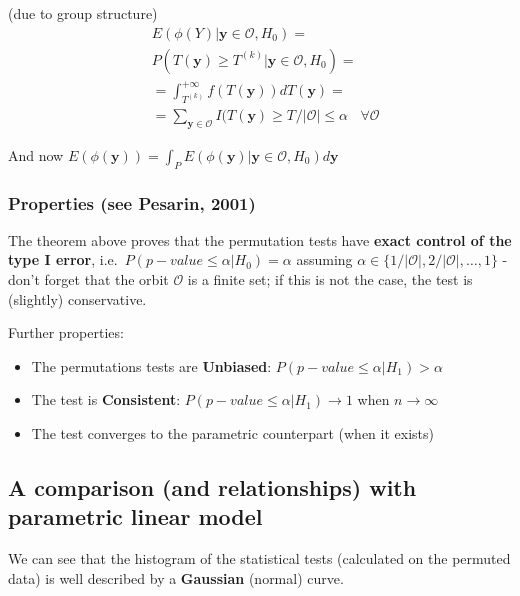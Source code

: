 \documentclass[
]{article}
\providecommand{\tightlist}{%
  \setlength{\itemsep}{0pt}\setlength{\parskip}{0pt}}
\begin{document}
(due to group structure) \[
\begin{aligned}
&E(\phi(Y)|\mathbf{y}\in\mathcal{O}, H_0)=\\
&P(T(\mathbf{y})\geq T^{(k)} | \mathbf{y}\in\mathcal{O}, H_0)=\\
&=\int_{T^{(k)}}^{+\infty} f(T(\mathbf{y}))dT(\mathbf{y})=\\
&=\sum_{\mathbf{y}\in\mathcal{O}} I(T(\mathbf{y})\geq T^{}/|\mathcal{O}|\leq \alpha
\ \ \ \ \forall\mathcal{O}
\end{aligned}
\]

And now
\(E(\phi(\mathbf{y}))=\int_P E(\phi(\mathbf{y})|\mathbf{y}\in\mathcal{O}, H_0) d\mathbf{y}\)

\hypertarget{properties-see-pesarin-2001}{%
\subsubsection{Properties (see Pesarin,
2001)}\label{properties-see-pesarin-2001}}

The theorem above proves that the permutation tests have \textbf{exact
control of the type I error}, i.e.~\(P(p-value\leq \alpha|H_0)=\alpha\)
assuming \(\alpha\in \{1/|\mathcal{O}|,2/|\mathcal{O}|,\ldots,1\}\) -
don't forget that the orbit \(\mathcal{O}\) is a finite set; if this is
not the case, the test is (slightly) conservative.

Further properties:

\begin{itemize}
\tightlist
\item
  The permutations tests are \textbf{Unbiased}:
  \(P(p-value\leq \alpha|H_1)>\alpha\)\\
\item
  The test is \textbf{Consistent}: \(P(p-value\leq \alpha|H_1)\to 1\)
  when \(n\to\infty\)\\
\item
  The test converges to the parametric counterpart (when it exists)
\end{itemize}

\hypertarget{a-comparison-and-relationships-with-parametric-linear-model}{%
\subsection{A comparison (and relationships) with parametric linear
model}\label{a-comparison-and-relationships-with-parametric-linear-model}}

We can see that the histogram of the statistical tests (calculated on
the permuted data) is well described by a \textbf{Gaussian }(normal)
curve.
\end{document}
